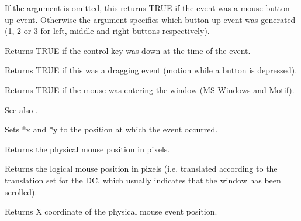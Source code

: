 

If the argument is omitted, this returns TRUE if the event was a mouse
button up event. Otherwise the argument specifies which button-up event
was generated (1, 2 or 3 for left, middle and right buttons respectively).



Returns TRUE if the control key was down at the time of the event.



Returns TRUE if this was a dragging event (motion while a button is depressed).

\label{wxmouseevententering}


Returns TRUE if the mouse was entering the window (MS Windows and Motif).

See also .

\label{wxmouseeventgetposition}



Sets *x and *y to the position at which the event occurred.

Returns the physical mouse position in pixels.

\label{wxmouseeventgetlogicalposition}


Returns the logical mouse position in pixels (i.e. translated according to the
translation set for the DC, which usually indicates that the window has been scrolled).

\label{wxmouseeventgetx}


Returns X coordinate of the physical mouse event position.

\label{wxmouseeventgety}

